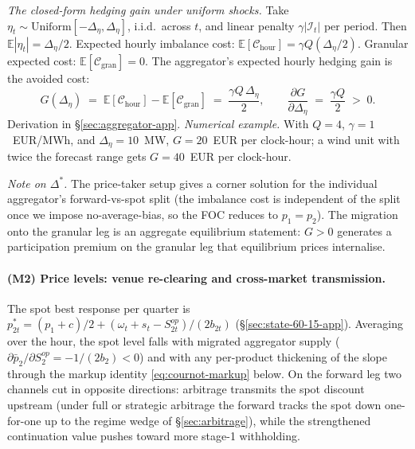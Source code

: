 \documentclass[11pt,a4paper]{article}
\theoremstyle{definition}
\theoremstyle{remark}
\theoremstyle{plain}
\begin{document}
\smallskip
\emph{The closed-form hedging gain under uniform shocks.} Take $\eta_t \sim \mathrm{Uniform}[-\Delta_\eta, \Delta_\eta]$, i.i.d.\ across $t$, and linear penalty $\gamma |\mathcal{I}_t|$ per period. Then $\mathbb{E}|\eta_t| = \Delta_\eta/2$. Expected hourly imbalance cost: $\mathbb{E}[\mathcal{C}_{\text{hour}}] = \gamma Q (\Delta_\eta/2)$. Granular expected cost: $\mathbb{E}[\mathcal{C}_{\text{gran}}] = 0$. The aggregator's expected hourly hedging gain is the avoided cost:
\begin{equation}
\boxed{\;G(\Delta_\eta) \;=\; \mathbb{E}[\mathcal{C}_{\text{hour}}] - \mathbb{E}[\mathcal{C}_{\text{gran}}] \;=\; \dfrac{\gamma Q \, \Delta_\eta}{2}, \qquad \dfrac{\partial G}{\partial \Delta_\eta} \;=\; \dfrac{\gamma Q}{2} \;>\; 0.\;}
\label{eq:shift}
\end{equation}
Derivation in \S\ref{sec:aggregator-app}. \emph{Numerical example.} With $Q = 4$, $\gamma = 1$~EUR/MWh, and $\Delta_\eta = 10$~MW, $G = 20$~EUR per clock-hour; a wind unit with twice the forecast range gets $G = 40$~EUR per clock-hour.

\smallskip
\emph{Note on $\Delta^*$.} The price-taker setup gives a corner solution for the individual aggregator's forward-vs-spot split (the imbalance cost is independent of the split once we impose no-average-bias, so the FOC reduces to $p_1 = p_2$). The migration onto the granular leg is an aggregate equilibrium statement: $G > 0$ generates a participation premium on the granular leg that equilibrium prices internalise.

\paragraph{(M2) Price levels: venue re-clearing and cross-market transmission.} The spot best response per quarter is $p_{2t}^* = (p_1 + c)/2 + (\omega_t + s_t - S^{op}_{2t})/(2 b_{2t})$ (\S\ref{sec:state-60-15-app}). Averaging over the hour, the spot level falls with migrated aggregator supply ($\partial \bar p_2 / \partial S^{op}_2 = -1/(2 b_2) < 0$) and with any per-product thickening of the slope through the markup identity \eqref{eq:cournot-markup} below. On the forward leg two channels cut in opposite directions: arbitrage transmits the spot discount upstream (under full or strategic arbitrage the forward tracks the spot down one-for-one up to the regime wedge of \S\ref{sec:arbitrage}), while the strengthened continuation value pushes toward more stage-1 withholding.
\end{document}
